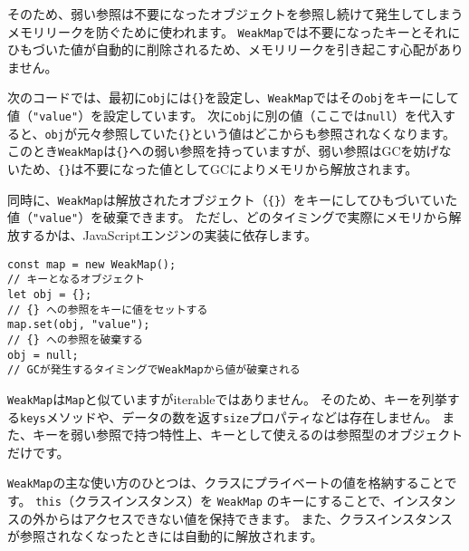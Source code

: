 そのため、弱い参照は不要になったオブジェクトを参照し続けて発生してしまうメモリリークを防ぐために使われます。
\texttt{WeakMap}では不要になったキーとそれにひもづいた値が自動的に削除されるため、メモリリークを引き起こす心配がありません。

次のコードでは、最初に\texttt{obj}には\texttt{\{\}}を設定し、\texttt{WeakMap}ではその\texttt{obj}をキーにして値（\texttt{"value"}）を設定しています。
次に\texttt{obj}に別の値（ここでは\texttt{null}）を代入すると、\texttt{obj}が元々参照していた\texttt{\{\}}という値はどこからも参照されなくなります。
このとき\texttt{WeakMap}は\texttt{\{\}}への弱い参照を持っていますが、弱い参照はGCを妨げないため、\texttt{\{\}}は不要になった値としてGCによりメモリから解放されます。

同時に、\texttt{WeakMap}は解放されたオブジェクト（\texttt{\{\}}）をキーにしてひもづいていた値（\texttt{"value"}）を破棄できます。
ただし、どのタイミングで実際にメモリから解放するかは、JavaScriptエンジンの実装に依存します。

\begin{lstlisting}
const map = new WeakMap();
// キーとなるオブジェクト
let obj = {};
// {} への参照をキーに値をセットする
map.set(obj, "value");
// {} への参照を破棄する
obj = null;
// GCが発生するタイミングでWeakMapから値が破棄される
\end{lstlisting}

\texttt{WeakMap}は\texttt{Map}と似ていますがiterableではありません。
そのため、キーを列挙する\texttt{keys}メソッドや、データの数を返す\texttt{size}プロパティなどは存在しません。
また、キーを弱い参照で持つ特性上、キーとして使えるのは参照型のオブジェクトだけです。

\texttt{WeakMap}の主な使い方のひとつは、クラスにプライベートの値を格納することです。
\texttt{this}（クラスインスタンス）を
\texttt{WeakMap}
のキーにすることで、インスタンスの外からはアクセスできない値を保持できます。
また、クラスインスタンスが参照されなくなったときには自動的に解放されます。

